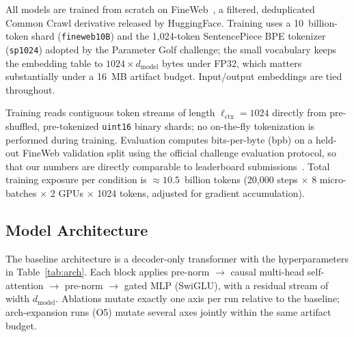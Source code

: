 \documentclass[11pt, letterpaper]{article}
\begin{document}
All models are trained from scratch on FineWeb~\cite{fineweb2024},
a filtered, deduplicated Common Crawl derivative released by
HuggingFace. Training uses a 10~billion-token shard
(\texttt{fineweb10B}) and the 1{,}024-token SentencePiece BPE
tokenizer (\texttt{sp1024}) adopted by the Parameter Golf
challenge; the small vocabulary keeps the embedding table to
$1024 \times d_{\text{model}}$ bytes under FP32, which matters
substantially under a 16~MB artifact budget. Input/output
embeddings are tied throughout.

Training reads contiguous token streams of length
$\ell_{\text{ctx}}=1024$ directly from pre-shuffled, pre-tokenized
\texttt{uint16} binary shards; no on-the-fly tokenization is
performed during training. Evaluation computes bits-per-byte
(bpb) on a held-out FineWeb validation split using the official
challenge evaluation protocol, so that our numbers are directly
comparable to leaderboard submissions~\cite{paramgolf2026}.
Total training exposure per condition is $\approx 10.5$~billion
tokens (20{,}000 steps $\times$ 8 micro-batches $\times$
2 GPUs $\times$ 1024 tokens, adjusted for gradient accumulation).

\subsection{Model Architecture}

The baseline architecture is a decoder-only transformer with the
hyperparameters in Table~\ref{tab:arch}. Each block applies
pre-norm $\rightarrow$ causal multi-head self-attention
$\rightarrow$ pre-norm $\rightarrow$ gated MLP (SwiGLU), with a
residual stream of width $d_{\text{model}}$. Ablations mutate
exactly one axis per run relative to the baseline; arch-expansion
runs (O5) mutate several axes jointly within the same artifact
budget.
\end{document}
